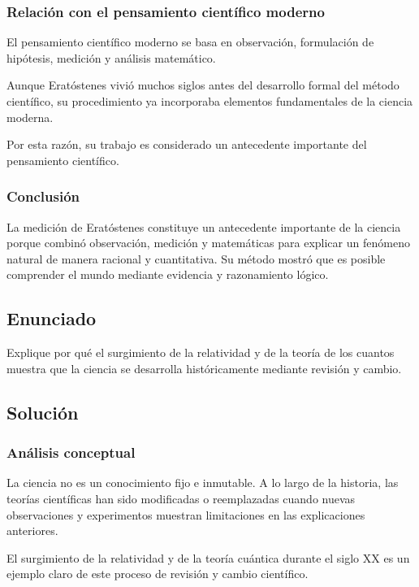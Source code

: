 \documentclass[12pt, a4paper]{article}
\begin{document}
\subsubsection*{Relación con el pensamiento científico moderno}

El pensamiento científico moderno se basa en observación, formulación de hipótesis, medición y análisis matemático.

Aunque Eratóstenes vivió muchos siglos antes del desarrollo formal del método científico, su procedimiento ya incorporaba elementos fundamentales de la ciencia moderna.

Por esta razón, su trabajo es considerado un antecedente importante del pensamiento científico.

\subsubsection*{Conclusión}

La medición de Eratóstenes constituye un antecedente importante de la ciencia porque combinó observación, medición y matemáticas para explicar un fenómeno natural de manera racional y cuantitativa. Su método mostró que es posible comprender el mundo mediante evidencia y razonamiento lógico.

\newpage

\subsection*{Enunciado}

Explique por qué el surgimiento de la relatividad y de la teoría de los cuantos muestra que la ciencia se desarrolla históricamente mediante revisión y cambio.

\subsection*{Solución}

\subsubsection*{Análisis conceptual}

La ciencia no es un conocimiento fijo e inmutable. A lo largo de la historia, las teorías científicas han sido modificadas o reemplazadas cuando nuevas observaciones y experimentos muestran limitaciones en las explicaciones anteriores.

El surgimiento de la relatividad y de la teoría cuántica durante el siglo XX es un ejemplo claro de este proceso de revisión y cambio científico.
\end{document}
